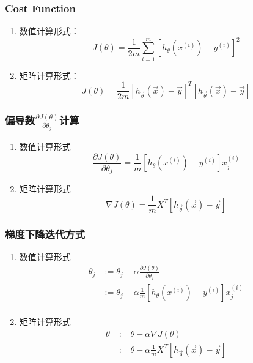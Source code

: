 \subsubsection{Cost Function}
\begin{enumerate}
\item 数值计算形式：
\begin{equation}
	J(\theta) = \frac{1}{2m} \sum_{i=1}^m \left[ h_\theta(x^{(i)}) - y^{(i)}\right]^2
\end{equation}

\item 矩阵计算形式：
\begin{equation}
	J(\theta) = \frac{1}{2m} \left[h_{\vec{\theta}}(\vec{x}) - \vec{y}\right]^T \left[ h_{\vec{\theta}}(\vec{x}) - \vec{y}\right]
\end{equation}
\end{enumerate}


\subsubsection{偏导数$\frac{\partial J(\theta)}{\partial \theta_j}$计算}
\begin{enumerate}
\item 数值计算形式
\begin{equation}
	\frac{\partial J(\theta)}{\partial \theta_j} =
	    \frac{1}{m} \left[ h_\theta(x^{(i)}) - y^{(i)} \right] x_j^{(i)}
\end{equation}

\item 矩阵计算形式
\begin{equation}
	\nabla J(\theta) = \frac{1}{m} X^T \left[h_{\vec{\theta}}(\vec{x}) - \vec{y}\right]
\end{equation}
\end{enumerate}


\subsubsection{梯度下降迭代方式}
\begin{enumerate}
\item 数值计算形式
\begin{equation}\begin{aligned}
	\theta_j &:= \theta_j - \alpha\frac{\partial J(\theta)}{\partial \theta_j} \\
		&:= \theta_j - \alpha \frac{1}{m} \left[h_\theta(x^{(i)}) - y^{(i)}\right] x_j^{(i)} \\
\end{aligned}\end{equation}

\item 矩阵计算形式
\begin{equation}\begin{aligned}
	\theta &:= \theta - \alpha\nabla J(\theta) \\
		&:= \theta - \alpha \frac{1}{m} X^T \left[ h_{\vec{\theta}}(\vec{x}) - \vec{y}\right]
\end{aligned}\end{equation}
\end{enumerate}



